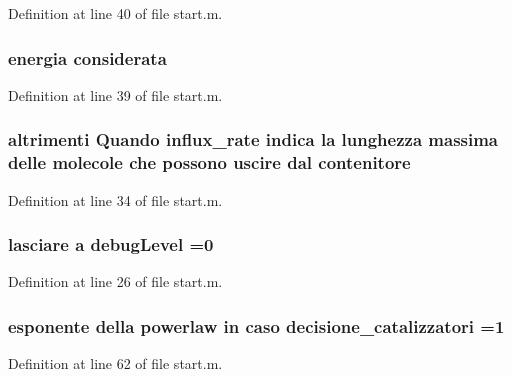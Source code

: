 Definition at line 40 of file start.\-m.

\hypertarget{a00065_ad76697f83c5d8bf201c45822af227e21}{
\subsubsection[{considerata}]{\setlength{\rightskip}{0pt plus 5cm}energia considerata}}\label{a00065_ad76697f83c5d8bf201c45822af227e21}


Definition at line 39 of file start.\-m.

\hypertarget{a00065_a8fcf98921930aa3720acdd081c5b0c2f}{
\subsubsection[{contenitore}]{\setlength{\rightskip}{0pt plus 5cm}altrimenti Quando {\bf influx\-\_\-rate} indica la {\bf lunghezza} massima delle molecole che possono uscire dal contenitore}}\label{a00065_a8fcf98921930aa3720acdd081c5b0c2f}


Definition at line 34 of file start.\-m.

\hypertarget{a00065_a08ef28bc85447e904ca9ea64de89b676}{
\subsubsection[{debug\-Level}]{\setlength{\rightskip}{0pt plus 5cm}lasciare {\bf a} debug\-Level =0}}\label{a00065_a08ef28bc85447e904ca9ea64de89b676}


Definition at line 26 of file start.\-m.

\hypertarget{a00065_a78948f867453293fcff0835b1bb05b8c}{
\subsubsection[{decisione\-\_\-catalizzatori}]{\setlength{\rightskip}{0pt plus 5cm}esponente della powerlaw in caso decisione\-\_\-catalizzatori =1}}\label{a00065_a78948f867453293fcff0835b1bb05b8c}


Definition at line 62 of file start.\-m.

